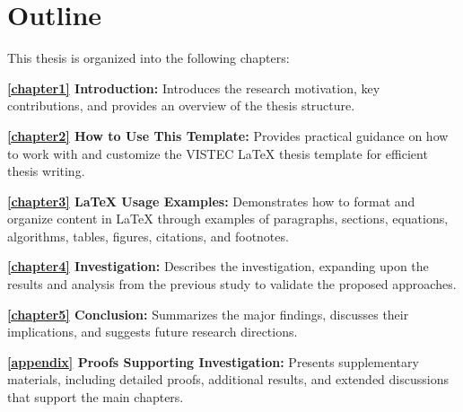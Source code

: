 \section{Outline}
\label{ch1:sec:outline}
\begin{paragraph}
This thesis is organized into the following chapters:

\textbf{\autoref{chapter1} Introduction:}  
Introduces the research motivation, key contributions, and provides an overview of the thesis structure.

\textbf{\autoref{chapter2} How to Use This Template:}  
Provides practical guidance on how to work with and customize the VISTEC \LaTeX{} thesis template for efficient thesis writing.

\textbf{\autoref{chapter3} LaTeX Usage Examples:}  
Demonstrates how to format and organize content in \LaTeX{} through examples of paragraphs, sections, equations, algorithms, tables, figures, citations, and footnotes.

\textbf{\autoref{chapter4} Investigation:}  
Describes the investigation, expanding upon the results and analysis from the previous study to validate the proposed approaches.

\textbf{\autoref{chapter5} Conclusion:}  
Summarizes the major findings, discusses their implications, and suggests future research directions.

\textbf{\autoref{appendix} Proofs Supporting Investigation:}  
Presents supplementary materials, including detailed proofs, additional results, and extended discussions that support the main chapters.
\end{paragraph}
